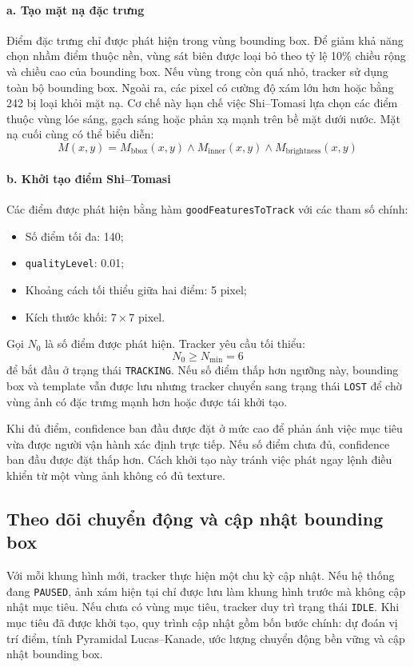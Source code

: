 \documentclass[../DoAn.tex]{subfiles}
\begin{document}
\paragraph{a. Tạo mặt nạ đặc trưng}
Điểm đặc trưng chỉ được phát hiện trong vùng bounding box. Để giảm khả năng chọn nhầm điểm thuộc nền, vùng sát biên được loại bỏ theo tỷ lệ 10\% chiều rộng và chiều cao của bounding box. Nếu vùng trong còn quá nhỏ, tracker sử dụng toàn bộ bounding box. Ngoài ra, các pixel có cường độ xám lớn hơn hoặc bằng 242 bị loại khỏi mặt nạ. Cơ chế này hạn chế việc Shi--Tomasi lựa chọn các điểm thuộc vùng lóe sáng, gạch sáng hoặc phản xạ mạnh trên bề mặt dưới nước. Mặt nạ cuối cùng có thể biểu diễn:
\[
M(x,y) = M_{\mathrm{bbox}}(x,y) \land M_{\mathrm{inner}}(x,y) \land M_{\mathrm{brightness}}(x,y)
\]

\paragraph{b. Khởi tạo điểm Shi--Tomasi}
Các điểm được phát hiện bằng hàm \texttt{goodFeaturesToTrack} với các tham số chính:
\begin{itemize}
    \item Số điểm tối đa: 140;
    \item \texttt{qualityLevel}: 0.01;
    \item Khoảng cách tối thiểu giữa hai điểm: 5 pixel;
    \item Kích thước khối: $7 \times 7$ pixel.
\end{itemize}

Gọi $N_0$ là số điểm được phát hiện. Tracker yêu cầu tối thiểu:
\[
N_0 \geq N_{\min} = 6
\]
để bắt đầu ở trạng thái \texttt{TRACKING}. Nếu số điểm thấp hơn ngưỡng này, bounding box và template vẫn được lưu nhưng tracker chuyển sang trạng thái \texttt{LOST} để chờ vùng ảnh có đặc trưng mạnh hơn hoặc được tái khởi tạo.

Khi đủ điểm, confidence ban đầu được đặt ở mức cao để phản ánh việc mục tiêu vừa được người vận hành xác định trực tiếp. Nếu số điểm chưa đủ, confidence ban đầu được đặt thấp hơn. Cách khởi tạo này tránh việc phát ngay lệnh điều khiển từ một vùng ảnh không có đủ texture.

\subsection{Theo dõi chuyển động và cập nhật bounding box}

Với mỗi khung hình mới, tracker thực hiện một chu kỳ cập nhật. Nếu hệ thống đang \texttt{PAUSED}, ảnh xám hiện tại chỉ được lưu làm khung hình trước mà không cập nhật mục tiêu. Nếu chưa có vùng mục tiêu, tracker duy trì trạng thái \texttt{IDLE}. Khi mục tiêu đã được khởi tạo, quy trình cập nhật gồm bốn bước chính: dự đoán vị trí điểm, tính Pyramidal Lucas--Kanade, ước lượng chuyển động bền vững và cập nhật bounding box.
\end{document}
